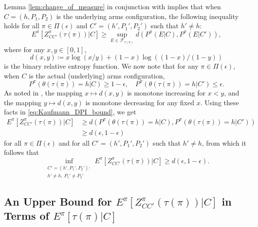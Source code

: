 Lemma \ref{lem:change_of_measure} in conjunction with \cite[Lemma 19]{Kaufmann2016} implies that when $C=(h, P_1, P_2)$ is the underlying arms configuration, the following inequality holds for all $\pi\in \Pi(\epsilon)$ and $C'=(h', P_1', P_2')$ such that $h'\neq h$:
\begin{equation}
	E^\pi[Z^\pi_{CC'}(\tau(\pi))|C]\geq \sup\limits_{E\in\mathcal{F}_{\tau(\pi)}} d(P^\pi(E|C),P^\pi(E|C')),\label{eq:Kaufmann_DPI_bound}
\end{equation}
where for any $x,y\in [0,1]$, $$d(x,y)\coloneqq x\log (x/y)+(1-x)\log ((1-x)/(1-y))$$ is the binary relative entropy function. We now note that for any $\pi\in\Pi(\epsilon)$, when $C$ is the actual (underlying) arms configuration, $$P^\pi(\theta(\tau(\pi))=h|C)\geq 1-\epsilon,\quad P^\pi(\theta(\tau(\pi))=h|C')\leq \epsilon.$$  As noted in \cite{Kaufmann2016}, the mapping $x\mapsto d(x,y)$ is monotone increasing for $x<y$, and the mapping $y\mapsto d(x,y)$ is monotone decreasing for any fixed $x$. Using these facts in \eqref{eq:Kaufmann_DPI_bound}, we get
\begin{align}
	E^\pi[Z^\pi_{CC'}(\tau(\pi))|C] & \geq d(P^\pi(\theta(\tau(\pi))=h|C),P^\pi(\theta(\tau(\pi))=h|C'))\nonumber\\
	&\geq d(\epsilon, 1-\epsilon)
\end{align}
for all $\pi\in\Pi(\epsilon)$ and for all $C'=(h', P_1', P_2')$ such that $h' \neq h$, from which it follows that
\begin{equation}
	\inf\limits_{\substack{C'=(h', P_1', P_2'):\\h'\neq h,~P_1'\neq P_2'}}E^\pi[Z^\pi_{CC'}(\tau(\pi))|C] \geq d(\epsilon, 1-\epsilon).
	\label{eq:Kaufmann_DPI_bound_epsilon}
\end{equation}
\subsection{An Upper Bound for  $E^\pi[Z^\pi_{CC'}(\tau(\pi))|C]$ in Terms of $ E^\pi[\tau(\pi)|C]$}


